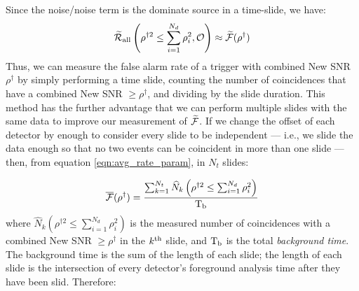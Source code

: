 Since the noise/noise term is the dominate source in a time-slide, we have:
\begin{equation}
\label{eqn:valid_slide_condition}
\tR_{\mathrm{all}}\left(\rho^{\dagger2} \leq \sum_{i=1}^{N_d} \rho_i^2, \mathcal{O} \right) \approx \widetilde{\far}(\rho^\dagger)
\end{equation}
Thus, we can measure the false alarm rate of a trigger with combined New \ac{SNR} $\rho^\dagger$ by simply performing a time slide, counting the number of coincidences that have a combined New \ac{SNR} $\geq \rho^\dagger$, and dividing by the slide duration. This method has the further advantage that we can perform multiple slides with the same data to improve our measurement of $\widetilde{\mathcal{F}}$. If we change the offset of each detector by enough to consider every slide to be independent --- i.e., we slide the data enough so that no two events can be coincident in more than one slide ---  then, from equation \ref{eqn:avg_rate_param}, in $N_t$ slides:

\begin{equation}
\label{eqn:meanFAR1}
\overline{\far}(\rho^\dagger) = \frac{\sum_{k=1}^{N_t} \widehat{N}_k \left(\rho^{\dagger2} \leq \sum_{i=1}^{N_d} \rho_i^2 \right)}{\Tb} 
\end{equation}
where $\widehat{N}_k \left(\rho^{\dagger2} \leq \sum_{i=1}^{N_d} \rho_i^2 \right)$ is the measured number of coincidences with a combined New \ac{SNR} $\geq \rho^\dagger$ in the $k^{\mathrm{th}}$ slide, and $\mathrm{T_b}$ is the total \emph{background time}. The background time is the sum of the length of each slide; the length of each slide is the intersection of every detector's foreground analysis time after they have been slid. Therefore:

